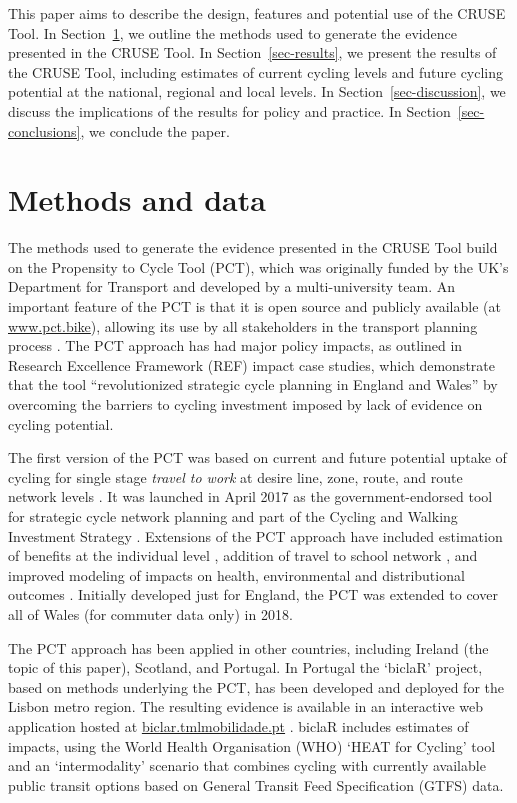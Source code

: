 \documentclass[
  super,
  preprint,
  3p]{elsarticle}
\begin{document}
This paper aims to describe the design, features and potential use of
the CRUSE Tool. In Section~\ref{sec-methods}, we outline the methods
used to generate the evidence presented in the CRUSE Tool. In
Section~\ref{sec-results}, we present the results of the CRUSE Tool,
including estimates of current cycling levels and future cycling
potential at the national, regional and local levels. In
Section~\ref{sec-discussion}, we discuss the implications of the results
for policy and practice. In Section~\ref{sec-conclusions}, we conclude
the paper.

\hypertarget{sec-methods}{%
\section{Methods and data}\label{sec-methods}}

The methods used to generate the evidence presented in the CRUSE Tool
build on the Propensity to Cycle Tool (PCT), which was originally funded
by the UK's Department for Transport and developed by a multi-university
team. An important feature of the PCT is that it is open source and
publicly available (at \href{https://www.pct.bike/}{www.pct.bike}),
allowing its use by all stakeholders in the transport planning process
\citep{lovelace2017}. The PCT approach has had major policy impacts, as
outlined in Research Excellence Framework (REF) impact case studies,
which demonstrate that the tool ``revolutionized strategic cycle
planning in England and Wales'' by overcoming the barriers to cycling
investment imposed by lack of evidence on cycling
potential\citep{lovelace2023}.

The first version of the PCT was based on current and future potential
uptake of cycling for single stage \emph{travel to work} at desire line,
zone, route, and route network levels \citep{lovelace2016}. It was
launched in April 2017 as the government-endorsed tool for strategic
cycle network planning and part of the Cycling and Walking Investment
Strategy \citep{cycling2017}. Extensions of the PCT approach have
included estimation of benefits at the individual level
\citep{woodcock2018}, addition of travel to school network
\citep{goodman2019}, and improved modeling of impacts on health,
environmental and distributional outcomes \citep{woodcock2021}.
Initially developed just for England, the PCT was extended to cover all
of Wales (for commuter data only) in 2018.

The PCT approach has been applied in other countries, including Ireland
(the topic of this paper), Scotland, and Portugal. In Portugal the
`biclaR' project, based on methods underlying the PCT, has been
developed and deployed for the Lisbon metro region. The resulting
evidence is available in an interactive web application hosted at
\href{https://biclar.tmlmobilidade.pt}{biclar.tmlmobilidade.pt}
\citep{felix2023}. biclaR includes estimates of impacts, using the World
Health Organisation (WHO) `HEAT for Cycling' tool and an `intermodality'
scenario that combines cycling with currently available public transit
options based on General Transit Feed Specification (GTFS) data.
\end{document}
